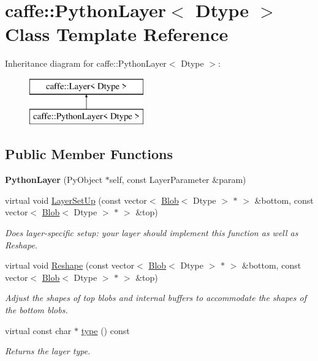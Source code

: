 \hypertarget{classcaffe_1_1PythonLayer}{}\section{caffe\+:\+:Python\+Layer$<$ Dtype $>$ Class Template Reference}
\label{classcaffe_1_1PythonLayer}
Inheritance diagram for caffe\+:\+:Python\+Layer$<$ Dtype $>$\+:\begin{figure}[H]
\begin{center}
\leavevmode
\includegraphics[height=2.000000cm]{classcaffe_1_1PythonLayer}
\end{center}
\end{figure}
\subsection*{Public Member Functions}
\begin{DoxyCompactItemize}
\item 
{\bfseries Python\+Layer} (Py\+Object $\ast$self, const Layer\+Parameter \&param)\hypertarget{classcaffe_1_1PythonLayer_a071a26bd659f12afcc9cc1e80645d484}{}\label{classcaffe_1_1PythonLayer_a071a26bd659f12afcc9cc1e80645d484}

\item 
virtual void \hyperlink{classcaffe_1_1PythonLayer_a937541b5935e0ada452b6af4155f6725}{Layer\+Set\+Up} (const vector$<$ \hyperlink{classcaffe_1_1Blob}{Blob}$<$ Dtype $>$ $\ast$ $>$ \&bottom, const vector$<$ \hyperlink{classcaffe_1_1Blob}{Blob}$<$ Dtype $>$ $\ast$ $>$ \&top)
\begin{DoxyCompactList}\small\item\em Does layer-\/specific setup\+: your layer should implement this function as well as Reshape. \end{DoxyCompactList}\item 
virtual void \hyperlink{classcaffe_1_1PythonLayer_a06e424b322ff1a6e53da3770cfc6fbc7}{Reshape} (const vector$<$ \hyperlink{classcaffe_1_1Blob}{Blob}$<$ Dtype $>$ $\ast$ $>$ \&bottom, const vector$<$ \hyperlink{classcaffe_1_1Blob}{Blob}$<$ Dtype $>$ $\ast$ $>$ \&top)
\begin{DoxyCompactList}\small\item\em Adjust the shapes of top blobs and internal buffers to accommodate the shapes of the bottom blobs. \end{DoxyCompactList}\item 
virtual const char $\ast$ \hyperlink{classcaffe_1_1PythonLayer_a31d97a3b458b12cd2491968a32fafa76}{type} () const \hypertarget{classcaffe_1_1PythonLayer_a31d97a3b458b12cd2491968a32fafa76}{}\label{classcaffe_1_1PythonLayer_a31d97a3b458b12cd2491968a32fafa76}

\begin{DoxyCompactList}\small\item\em Returns the layer type. \end{DoxyCompactList}\end{DoxyCompactItemize}
